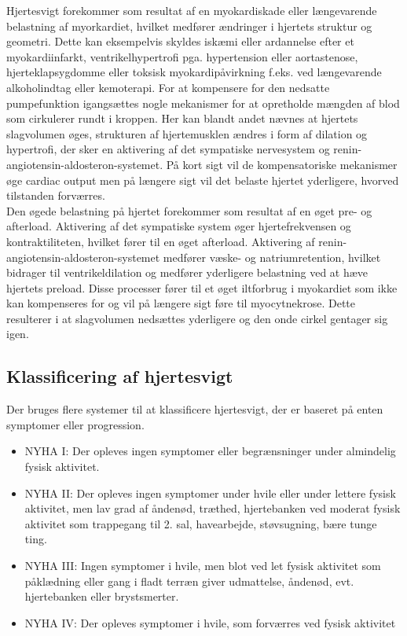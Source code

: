 Hjertesvigt forekommer som resultat af en myokardiskade eller længevarende belastning af myorkardiet, hvilket medfører ændringer i hjertets struktur og geometri. Dette kan eksempelvis skyldes iskæmi eller ardannelse efter et myokardiinfarkt, ventrikelhypertrofi pga. hypertension eller aortastenose, hjerteklapsygdomme eller toksisk myokardipåvirkning f.eks. ved længevarende alkoholindtag  eller kemoterapi. For at kompensere for den nedsatte pumpefunktion igangsættes nogle mekanismer for at opretholde mængden af blod som cirkulerer rundt i kroppen. Her kan blandt andet nævnes at hjertets slagvolumen øges, strukturen af hjertemusklen ændres i form af dilation og hypertrofi, der sker en aktivering af det sympatiske nervesystem og renin-angiotensin-aldosteron-systemet. På kort sigt vil de kompensatoriske mekanismer øge cardiac output men på længere sigt vil det belaste hjertet yderligere, hvorved tilstanden forværres.\citep{TSchroeder2016}\\
Den øgede belastning på hjertet forekommer som resultat af en øget pre- og afterload. Aktivering af det sympatiske system øger hjertefrekvensen og  kontraktiliteten, hvilket fører til en øget afterload. Aktivering af renin-angiotensin-aldosteron-systemet medfører væske- og natriumretention, hvilket bidrager til ventrikeldilation og medfører yderligere belastning ved at hæve hjertets preload. Disse processer fører til et øget iltforbrug i myokardiet som ikke kan kompenseres for og vil på længere sigt føre til myocytnekrose. Dette resulterer i at slagvolumen nedsættes yderligere og den onde cirkel gentager sig igen.\citep{TSchroeder2016}

\subsection{Klassificering af hjertesvigt}
Der bruges flere systemer til at klassificere hjertesvigt, der er baseret på enten symptomer eller progression. 

\begin{itemize} 
\item NYHA I: Der opleves ingen symptomer eller begrænsninger under almindelig fysisk aktivitet.
\item NYHA II: Der opleves ingen symptomer under hvile eller under lettere fysisk aktivitet, men lav grad af åndenød, træthed, hjertebanken ved moderat fysisk aktivitet som trappegang til 2. sal, havearbejde, støvsugning, bære tunge ting.
\item NYHA III:  Ingen symptomer i hvile, men blot ved let fysisk aktivitet som påklædning eller gang i fladt terræn giver udmattelse, åndenød, evt. hjertebanken eller brystsmerter.
\item NYHA IV: Der opleves symptomer i hvile, som forværres ved fysisk aktivitet
\end{itemize}

